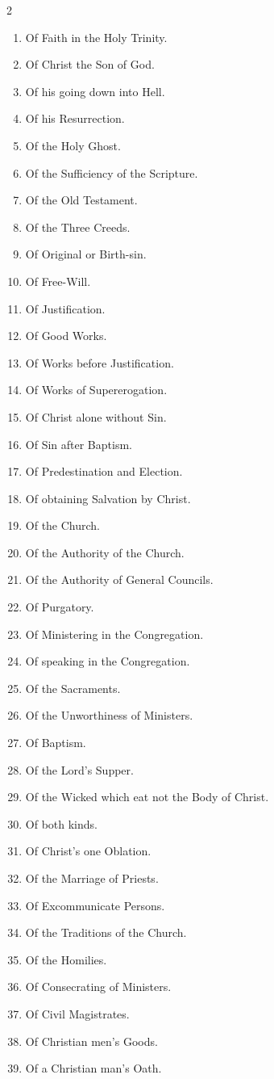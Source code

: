 
\begin{multicols}{2}
\begin{enumerate}
\item Of Faith in the Holy Trinity.
\item Of Christ the Son of God.
\item Of his going down into Hell.
\item Of his Resurrection.
\item Of the Holy Ghost.
\item Of the Sufficiency of the Scripture.
\item Of the Old Testament.
\item Of the Three Creeds.
\item Of Original or Birth-sin.
\item Of Free-Will.
\item Of Justification.
\item Of Good Works.
\item Of Works before Justification.
\item Of Works of Supererogation.
\item Of Christ alone without Sin.
\item Of Sin after Baptism.
\item Of Predestination and Election.
\item Of obtaining Salvation by Christ.
\item Of the Church.
\item Of the Authority of the Church.
\item Of the Authority of General Councils.
\item Of Purgatory.
\item Of Ministering in the Congregation.
\item Of speaking in the Congregation.
\item Of the Sacraments.
\item Of the Unworthiness of Ministers.
\item Of Baptism.
\item Of the Lord's Supper.
\item Of the Wicked which eat not the Body of Christ.
\item Of both kinds.
\item Of Christ's one Oblation.
\item Of the Marriage of Priests.
\item Of Excommunicate Persons.
\item Of the Traditions of the Church.
\item Of the Homilies.
\item Of Consecrating of Ministers.
\item Of Civil Magistrates.
\item Of Christian men's Goods.
\item Of a Christian man's Oath.
\end{enumerate}
\end{multicols}

